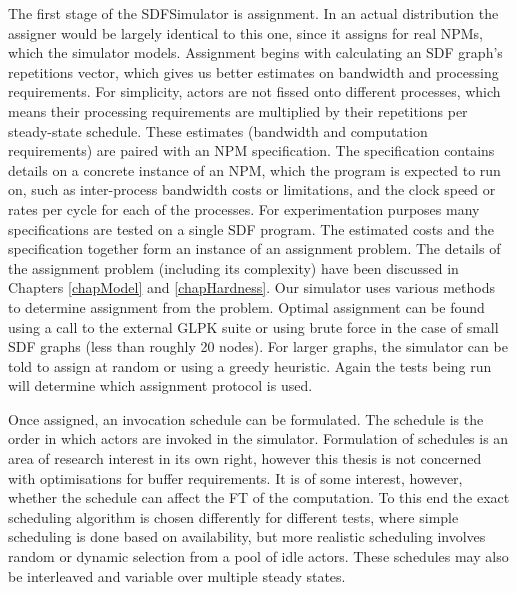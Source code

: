 The first stage of the SDFSimulator is assignment.
In an actual distribution the assigner would be largely identical to this one, since it assigns for real NPMs, which the simulator models.
Assignment begins with calculating an SDF graph's repetitions vector, which gives us better estimates on bandwidth and processing requirements.
For simplicity, actors are not fissed onto different processes, which means their processing requirements are multiplied by their repetitions per steady-state schedule.
These estimates (bandwidth and computation requirements) are paired with an NPM specification.
The specification contains details on a concrete instance of an NPM, which the program is expected to run on, such as inter-process bandwidth costs or limitations, and the clock speed or rates per cycle for each of the processes.
For experimentation purposes many specifications are tested on a single SDF program.
The estimated costs and the specification together form an instance of an assignment problem.
The details of the assignment problem (including its complexity) have been discussed in Chapters \ref{chapModel} and \ref{chapHardness}.
Our simulator uses various methods to determine assignment from the problem.
Optimal assignment can be found using a call to the external GLPK suite or using brute force in the case of small SDF graphs (less than roughly 20 nodes).
For larger graphs, the simulator can be told to assign at random or using a greedy heuristic.
Again the tests being run will determine which assignment protocol is used.

Once assigned, an invocation schedule can be formulated.
The schedule is the order in which actors are invoked in the simulator.
Formulation of schedules is an area of research interest in its own right, however this thesis is not concerned with optimisations for buffer requirements.
It is of some interest, however, whether the schedule can affect the FT of the computation.
To this end the exact scheduling algorithm is chosen differently for different tests, where simple scheduling is done based on availability, but more realistic scheduling involves random or dynamic selection from a pool of idle actors.
These schedules may also be interleaved and variable over multiple steady states.

